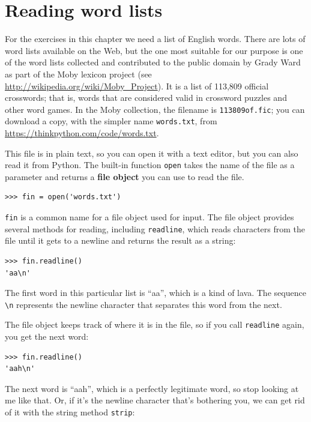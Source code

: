 \documentclass[10pt]{book}
\begin{document}
\section{Reading word lists}
\label{wordlist}

For the exercises in this chapter we need a list of English words.
There are lots of word lists available on the Web, but the one most
suitable for our purpose is one of the word lists collected and
contributed to the public domain by Grady Ward as part of the Moby
lexicon project (see \url{http://wikipedia.org/wiki/Moby_Project}).  It
is a list of 113,809 official crosswords; that is, words that are
considered valid in crossword puzzles and other word games.  In the
Moby collection, the filename is {\tt 113809of.fic}; you can download
a copy, with the simpler name {\tt words.txt}, from
\url{https://thinkpython.com/code/words.txt}.

This file is in plain text, so you can open it with a text
editor, but you can also read it from Python.  The built-in
function {\tt open} takes the name of the file as a parameter
and returns a {\bf file object} you can use to read the file.

\begin{verbatim}
>>> fin = open('words.txt')
\end{verbatim}
%
{\tt fin} is a common name for a file object used for input.  The file
object provides several methods for reading, including {\tt readline},
which reads characters from the file until it gets to a newline and
returns the result as a string: 

\begin{verbatim}
>>> fin.readline()
'aa\n'
\end{verbatim}
%
The first word in this particular list is ``aa'', which is a kind of
lava.  The sequence \verb"\n" represents the newline character that
separates this word from the next.

The file object keeps track of where it is in the file, so
if you call {\tt readline} again, you get the next word:

\begin{verbatim}
>>> fin.readline()
'aah\n'
\end{verbatim}
%
The next word is ``aah'', which is a perfectly legitimate
word, so stop looking at me like that.
Or, if it's the newline character that's bothering you,
we can get rid of it with the string method {\tt strip}:
\end{document}
